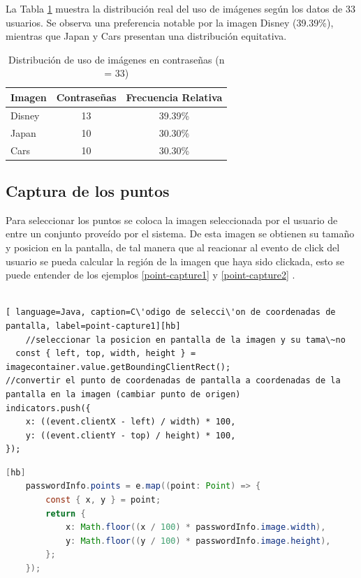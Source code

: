 La Tabla \ref{tab:uso-imagenes} muestra la distribución real del uso de imágenes según los datos de 33 usuarios. Se observa una preferencia notable por la imagen Disney (39.39\%), mientras que Japan y Cars presentan una distribución equitativa.


\begin{table}[ht]
	\centering
	\caption{Distribución de uso de imágenes en contraseñas (n = 33)}
	\label{tab:uso-imagenes}
	\begin{tabularx}{0.8\textwidth}{Xcc}
		\toprule
		\textbf{Imagen} & \textbf{Contraseñas} & \textbf{Frecuencia Relativa} \\
		\midrule
		Disney & 13 & 39.39\% \\
		Japan & 10 & 30.30\% \\
		Cars & 10 & 30.30\% \\
		\bottomrule
	\end{tabularx}
	\vspace{0.2cm}

\end{table}



\subsection{Captura de los puntos}
Para seleccionar los puntos se coloca la imagen seleccionada por el usuario de entre un conjunto prove\'ido por el sistema. De esta imagen se obtienen su tama\~no y posicion en la pantalla, de tal manera que al reacionar al evento de click del usuario se pueda calcular la regi\'on de la imagen que haya sido clickada, esto se puede entender de los ejemplos \ref{point-capture1} y \ref{point-capture2} . \\\\

\begin{lstlisting}[ language=Java, caption=C\'odigo de selecci\'on de coordenadas de pantalla, label=point-capture1][hb]
	//seleccionar la posicion en pantalla de la imagen y su tama\~no
  const { left, top, width, height } =
imagecontainer.value.getBoundingClientRect();
//convertir el punto de coordenadas de pantalla a coordenadas de la pantalla en la imagen (cambiar punto de origen)
indicators.push({
	x: ((event.clientX - left) / width) * 100,
	y: ((event.clientY - top) / height) * 100,
});

\end{lstlisting}


\begin{lstlisting}[style=mystyle, language=Java, caption=C\'odigo de transformaci\'on en coordenadas de imagen, label=point-capture2][hb]
	passwordInfo.points = e.map((point: Point) => {
		const { x, y } = point;
		return {
			x: Math.floor((x / 100) * passwordInfo.image.width),
			y: Math.floor((y / 100) * passwordInfo.image.height),
		};
	});
\end{lstlisting}

